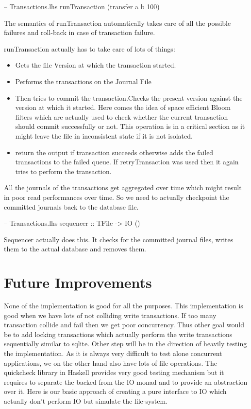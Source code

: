 \documentclass[11pt,a4paper]{article}
\begin{document}
\begin{code}[name=Transactions]
-- Transactions.lhs
runTransaction (transfer a b 100)
\end{code}

The semantics of runTransaction automatically
takes care of all the possible failures and roll-back in case of
transaction failure.

runTransaction actually has to take care of lots of things:

\begin{itemize}
\item Gets the file Version at which the transaction started.
\item Performs the transactions on the Journal File 
\item Then tries to commit the transaction.Checks the present version against the version at which it started. Here comes the idea of space efficient Bloom filters which are actually used to check whether the current transaction should commit successfully or not. This operation is in a critical section as it might leave the file in inconsistent state if it is not isolated. 
\item return the output if transaction succeeds otherwise adds the failed transactions to the failed queue. If retryTransaction was used then it again tries to perform the transaction. 
\end{itemize}

All the journals of the transactions get aggregated over time which might result in poor read performances over time. So we need to actually checkpoint the committed journals back to the database file.

\begin{code}[name=Transactions]
-- Transactions.lhs
sequencer :: TFile -> IO () 
\end{code}

Sequencer actually does this. It checks for the committed journal files, writes them to the actual database and removes them. 

\section{Future Improvements}
None of the implementation is good for all the purposes. This implementation is good when we have lots of not colliding write transactions. If too many transaction collide and fail then we get poor concurrency. Thus other goal would be to add locking transactions which actually perform the write transactions sequentially similar to sqlite. 
Other step will be in the direction of heavily testing the implementation. As it is always very difficult to test alone concurrent applications, we on the other hand also have lots of file operations. The quickcheck library in Haskell provides very good testing mechanism but it requires to separate the backed from the IO monad and to provide an abstraction over it.
Here is our basic approach of creating a pure interface to IO which actually don't perform IO but simulate the file-system. 
\end{document}
